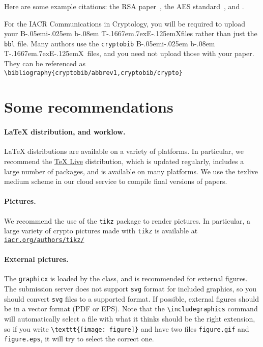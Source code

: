 \documentclass{iacrcc}
\def\BibTeX{{\rm B\kern-.05em{\sc i\kern-.025em b}\kern-.08em
    T\kern-.1667em\lower.7ex\hbox{E}\kern-.125emX}}
\begin{document}
Here are some example citations: the RSA paper~\cite{RSA78}, the AES
standard~\cite{AES-FIPS}, and \cite{DBLP:conf/crypto/Kocher96}.

For the IACR Communications in Cryptology, you will be required to
upload your \BibTeX files rather than just the \texttt{bbl} file.
Many authors use the \texttt{cryptobib} \BibTeX\ files, and you need
not upload those with your paper. They can be referenced as
\texttt{\textbackslash bibliography\{cryptobib/abbrev1,cryptobib/crypto\}}

\section{Some recommendations}\label{sec:options}

\paragraph{\LaTeX{} distribution, and worklow.}  \LaTeX{}
distributions are available on a variety of platforms.  In particular,
we recommend the \href{https://www.tug.org/texlive/}{TeX Live}
distribution, which is updated regularly, includes a large number of
packages, and is available on many platforms. We use the texlive medium
scheme in our cloud service to compile final versions of papers.

\paragraph{Pictures.}
We recommend the use of the \texttt{tikz} package to render pictures.
In particular, a large variety of crypto pictures made with
\texttt{tikz} is available at \href{http://iacr.org/authors/tikz/}{\texttt{iacr.org/authors/tikz/}}

\paragraph{External pictures.}  The \texttt{graphicx} is loaded by the
class, and is recommended for external figures. The submission server
does not support \texttt{svg} format for included graphics, so you
should convert \texttt{svg} files to a supported format.  If possible,
external figures should be in a vector format (PDF or EPS).  Note that
the \verb+\includegraphics+ command will automatically select a file
with what it thinks should be the right extension, so if you write
\verb+\texttt{[image: figure]}+ and have two files \texttt{figure.gif}
and \texttt{figure.eps}, it will try to select the correct one.
\end{document}
